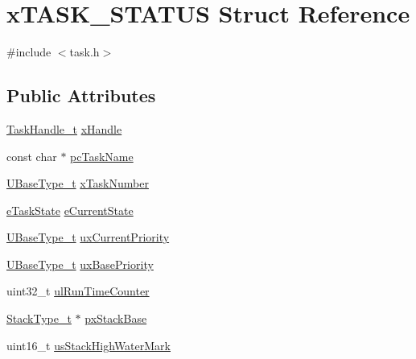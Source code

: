 \hypertarget{structx_t_a_s_k___s_t_a_t_u_s}{}\section{x\+T\+A\+S\+K\+\_\+\+S\+T\+A\+T\+US Struct Reference}
\label{structx_t_a_s_k___s_t_a_t_u_s}


{\ttfamily \#include $<$task.\+h$>$}

\subsection*{Public Attributes}
\begin{DoxyCompactItemize}
\item 
\hyperlink{task_8h_ae95f44d4cfeb4a599c6cc258d241cb6b}{Task\+Handle\+\_\+t} \hyperlink{structx_t_a_s_k___s_t_a_t_u_s_ac57f825f365c3c64bba827285fe3c2a0}{x\+Handle}
\item 
const char $\ast$ \hyperlink{structx_t_a_s_k___s_t_a_t_u_s_ad272663e2560bd9ea088384a39ba6192}{pc\+Task\+Name}
\item 
\hyperlink{portmacro_8h_a646f89d4298e4f5afd522202b11cb2e6}{U\+Base\+Type\+\_\+t} \hyperlink{structx_t_a_s_k___s_t_a_t_u_s_acd44468ba37270b04f83d0833c098057}{x\+Task\+Number}
\item 
\hyperlink{task_8h_a1749369458e2282a22e862a619a3892c}{e\+Task\+State} \hyperlink{structx_t_a_s_k___s_t_a_t_u_s_a727e904e3afe49472b0fc6a4e96439cb}{e\+Current\+State}
\item 
\hyperlink{portmacro_8h_a646f89d4298e4f5afd522202b11cb2e6}{U\+Base\+Type\+\_\+t} \hyperlink{structx_t_a_s_k___s_t_a_t_u_s_a39df647234fc0d6de5852042a2741a94}{ux\+Current\+Priority}
\item 
\hyperlink{portmacro_8h_a646f89d4298e4f5afd522202b11cb2e6}{U\+Base\+Type\+\_\+t} \hyperlink{structx_t_a_s_k___s_t_a_t_u_s_a692f4c8957b7270f1579cdee63ff287e}{ux\+Base\+Priority}
\item 
uint32\+\_\+t \hyperlink{structx_t_a_s_k___s_t_a_t_u_s_a92ab83f4f376c255dedf8e06a78261f7}{ul\+Run\+Time\+Counter}
\item 
\hyperlink{portmacro_8h_a84e9a8ba132feed0b2401c1f4e2ac63c}{Stack\+Type\+\_\+t} $\ast$ \hyperlink{structx_t_a_s_k___s_t_a_t_u_s_a0ee59674d2cc57d3a5a29c777d5452ed}{px\+Stack\+Base}
\item 
uint16\+\_\+t \hyperlink{structx_t_a_s_k___s_t_a_t_u_s_a284892acd41bff7c319295687a95af6b}{us\+Stack\+High\+Water\+Mark}
\end{DoxyCompactItemize}


